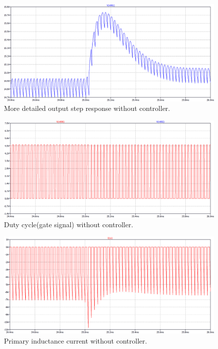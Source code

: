 \documentclass{article}
\begin{document}
\begin{figure}[H]
    \centering
    \includegraphics[scale=0.4]{24 to 48 v input(controlcu kullanmadan)-line regulation belli.png}
    \caption{More detailed output step response without controller.}
    \label{fig:my_label}
\end{figure}

\begin{figure}[H]
    \centering
    \includegraphics[scale=0.4]{24 to 48 v input(controlcu kullanmadan)(duty cycle.png}
    \caption{Duty cycle(gate signal) without controller.}
    \label{fig:my_label}
\end{figure}

\begin{figure}[H]
    \centering
    \includegraphics[scale=0.4]{24 to 48 v input(controlcu kullanmadan)(primary inductance current).png}
    \caption{Primary inductance current without controller.}
    \label{fig:my_label}
\end{figure}
\end{document}
